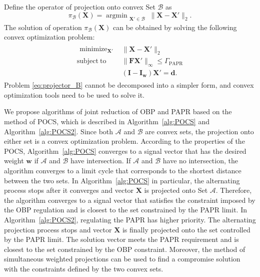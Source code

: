 \documentclass[paper]{ieice}
\begin{document}
Define the operator of projection onto convex Set $\mathcal{B}$ as
\begin{equation}
\pi_{\mathcal{B}}(\mathbf{X}) = \mathop{\mathrm{argmin}}_{\substack{\mathbf{X}' \in \mathcal{B}}} \|\mathbf{X}-\mathbf{X}'\|_2. \label{eq:projection_papr}
\end{equation}
The solution of operation $\pi_{\mathcal{B}}(\mathbf{X})$ can be obtained by solving the following convex optimization problem:
\begin{eqnarray}
\begin{array}{ll}
\begin{split}
\mathop{\mathrm{minimize}}_{\mathbf{X}'}
\end{split}  
& \|\mathbf{X}-\mathbf{X}'\|_2 \\
\mathrm{subject~to} & \| \mathbf{F}\mathbf{X}'\|_{\infty} \leq \Gamma_{\mathrm{PAPR}} \\
&(\mathbf{I}-\mathbf{I}_{\mathbf{w}})\mathbf{X}' = \mathbf{d}.
\end{array} \label{eq:projector_B}
\end{eqnarray}
Problem \eqref{eq:projector_B} cannot be decomposed into a simpler form, and convex optimization tools need to be used to solve it.



We propose algorithms of joint reduction of OBP and PAPR based on the method of POCS, which is described in Algorithm~\ref{alg:POCS} and Algorithm~\ref{alg:POCS2}.  Since both $\mathcal{A}$ and $\mathcal{B}$ are convex sets, the projection onto either set is a convex optimization problem.  According to the properties of the POCS, Algorithm~\ref{alg:POCS} converges to a signal vector that has the desired weight $\mathbf{w}$ if $\mathcal{A}$ and $\mathcal{B}$ have intersection.   If $\mathcal{A}$ and $\mathcal{B}$ have no intersection, the algorithm converges to a limit cycle that corresponds to the shortest distance between the two sets.  In Algorithm~\ref{alg:POCS} in particular, the alternating process stops after it converges and vector $\mathbf{X}$ is projected onto Set $\mathcal{A}$.  Therefore, the algorithm converges to a signal vector that satisfies the constraint imposed by the OBP regulation and is closest to the set constrained by the PAPR limit. In Algorithm~\ref{alg:POCS2}, regulating the PAPR has higher priority. The alternating projection process stops and vector $\mathbf{X}$ is finally projected onto the set controlled by the PAPR limit. The solution vector meets the PAPR requirement and is closest to the set constrained by the OBP constraint. Moreover, the method of simultaneous weighted projections can be used to find a compromise solution with the constraints defined by the two convex sets. 
\end{document}
